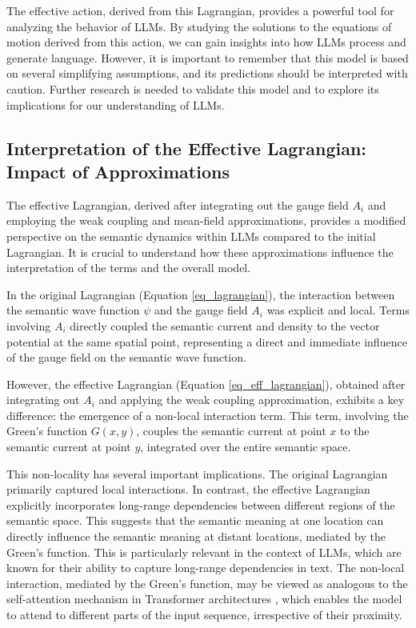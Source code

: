 \documentclass[prd,amsmath,amssymb,12pt]{revtex4}
\begin{document}
The effective action, derived from this Lagrangian, provides a powerful tool for analyzing the behavior of LLMs.
By studying the solutions to the equations of motion derived from this action, we can gain insights into
how LLMs process and generate language. However, it is important to remember that this model is based on several
simplifying assumptions, and its predictions should be interpreted with caution. Further research is needed
to validate this model and to explore its implications for our understanding of LLMs.

\subsection{Interpretation of the Effective Lagrangian: Impact of Approximations}

The effective Lagrangian, derived after integrating out the gauge field $A_i$ and employing
the weak coupling and mean-field approximations, provides a modified perspective on the
semantic dynamics within LLMs compared to the initial Lagrangian. It is crucial to
understand how these approximations influence the interpretation of the terms and the overall model.

In the original Lagrangian (Equation \ref{eq_lagrangian}), the interaction
between the semantic wave function $\psi$ and the gauge field $A_i$ was explicit
and local. Terms involving $A_i$ directly coupled the semantic current and density
to the vector potential at the same spatial point, representing a direct and immediate
influence of the gauge field on the semantic wave function.

However, the effective Lagrangian (Equation \ref{eq_eff_lagrangian}),
obtained after integrating out $A_i$ and applying the weak coupling approximation,
exhibits a key difference: the emergence of a non-local interaction term. This term,
involving the Green's function $G(x, y)$, couples the semantic current at point $x$
to the semantic current at point $y$, integrated over the entire semantic space.

This non-locality has several important implications. The original Lagrangian
primarily captured local interactions. In contrast, the effective Lagrangian
explicitly incorporates long-range dependencies between different regions of
the semantic space. This suggests that the semantic meaning at one location can
directly influence the semantic meaning at distant locations, mediated by the
Green's function. This is particularly relevant in the context of LLMs, which are
known for their ability to capture long-range dependencies in text. The non-local
interaction, mediated by the Green's function, may be viewed as analogous to the
self-attention mechanism in Transformer architectures \cite{transformer}, which
enables the model to attend to different parts of the input sequence, irrespective of
their proximity.
\end{document}

